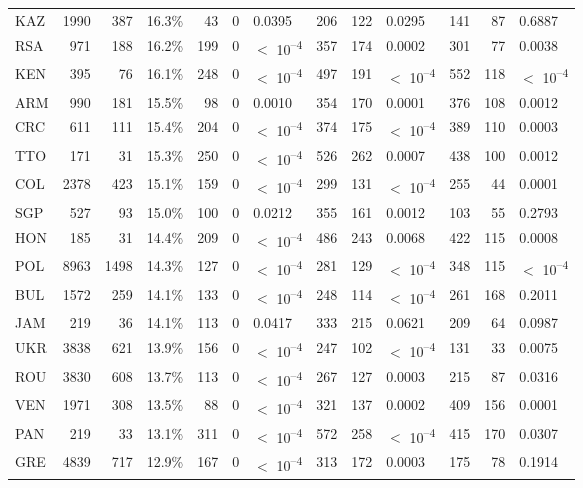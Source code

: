 \begin{tabular}[t]{lrrlrrlrrlrrl}
KAZ & 1990 & 387 & 16.3\% & 43 & 0 & 0.0395 & 206 & 122 & 0.0295 & 141 & 87 & 0.6887\\
RSA & 971 & 188 & 16.2\% & 199 & 0 & $<$ 10\textsuperscript{--4} & 357 & 174 & 0.0002 & 301 & 77 & 0.0038\\
KEN & 395 & 76 & 16.1\% & 248 & 0 & $<$ 10\textsuperscript{--4} & 497 & 191 & $<$ 10\textsuperscript{--4} & 552 & 118 & $<$ 10\textsuperscript{--4}\\
ARM & 990 & 181 & 15.5\% & 98 & 0 & 0.0010 & 354 & 170 & 0.0001 & 376 & 108 & 0.0012\\
CRC & 611 & 111 & 15.4\% & 204 & 0 & $<$ 10\textsuperscript{--4} & 374 & 175 & $<$ 10\textsuperscript{--4} & 389 & 110 & 0.0003\\
TTO & 171 & 31 & 15.3\% & 250 & 0 & $<$ 10\textsuperscript{--4} & 526 & 262 & 0.0007 & 438 & 100 & 0.0012\\
COL & 2378 & 423 & 15.1\% & 159 & 0 & $<$ 10\textsuperscript{--4} & 299 & 131 & $<$ 10\textsuperscript{--4} & 255 & 44 & 0.0001\\
SGP & 527 & 93 & 15.0\% & 100 & 0 & 0.0212 & 355 & 161 & 0.0012 & 103 & 55 & 0.2793\\
HON & 185 & 31 & 14.4\% & 209 & 0 & $<$ 10\textsuperscript{--4} & 486 & 243 & 0.0068 & 422 & 115 & 0.0008\\
POL & 8963 & 1498 & 14.3\% & 127 & 0 & $<$ 10\textsuperscript{--4} & 281 & 129 & $<$ 10\textsuperscript{--4} & 348 & 115 & $<$ 10\textsuperscript{--4}\\
BUL & 1572 & 259 & 14.1\% & 133 & 0 & $<$ 10\textsuperscript{--4} & 248 & 114 & $<$ 10\textsuperscript{--4} & 261 & 168 & 0.2011\\
JAM & 219 & 36 & 14.1\% & 113 & 0 & 0.0417 & 333 & 215 & 0.0621 & 209 & 64 & 0.0987\\
UKR & 3838 & 621 & 13.9\% & 156 & 0 & $<$ 10\textsuperscript{--4} & 247 & 102 & $<$ 10\textsuperscript{--4} & 131 & 33 & 0.0075\\
ROU & 3830 & 608 & 13.7\% & 113 & 0 & $<$ 10\textsuperscript{--4} & 267 & 127 & 0.0003 & 215 & 87 & 0.0316\\
VEN & 1971 & 308 & 13.5\% & 88 & 0 & $<$ 10\textsuperscript{--4} & 321 & 137 & 0.0002 & 409 & 156 & 0.0001\\
PAN & 219 & 33 & 13.1\% & 311 & 0 & $<$ 10\textsuperscript{--4} & 572 & 258 & $<$ 10\textsuperscript{--4} & 415 & 170 & 0.0307\\
GRE & 4839 & 717 & 12.9\% & 167 & 0 & $<$ 10\textsuperscript{--4} & 313 & 172 & 0.0003 & 175 & 78 & 0.1914\\

\end{tabular}
